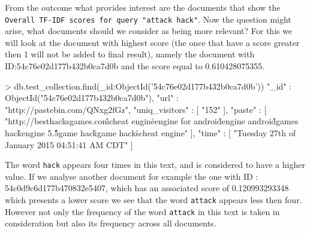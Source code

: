 \documentclass[12pt]{article}
\begin{document}
\parbox{\linewidth}{
From the outcome what provides interest are the documents that show the \texttt{Overall TF-IDF scores for query "attack hack"}. Now the question might arise, what documents should we consider as being more relevant? For this we will look at the document with highest score (the once that have a score greater then 1 will not be added to final result), namely the document with ID:54c76e02d177b432b0ca7d0b and the score equal to 0.610428075355.}
\begin{spverbatim}
> db.test_collection.find({_id:ObjectId('54c76e02d177b432b0ca7d0b')})
{ "_id" : ObjectId("54c76e02d177b432b0ca7d0b"), "url" : "http://pastebin.com/QNxg2fGz", "uniq_visitors" : [ "152" ], "paste" : [ "http://besthacksgames.com\r\n\r\nandroid cheat engine\r\ncheat engine for android\r\ncheat engine android\r\nandroid games hack\r\ncheat engine 5.5\r\n\r\nandroid game hack\r\nandroid game hacks\r\nandroid cheat engine" ], "time" : [ "Tuesday 27th of January 2015 04:51:41 AM CDT" ] }
\end{spverbatim}
\hfill \break 
The word \texttt{hack} appears four times in this text, and is considered to have a higher value.
If we analyse another document for example the one with ID :  54c0d9c6d177b470832e5407, which has an associated score of  0.120993293348 which presents a lower score we see that the word \texttt{attack} appears less then four. However not only the frequency of the word \texttt{attack} in this text is taken in consideration but also its frequency across all documents.

\end{document}
